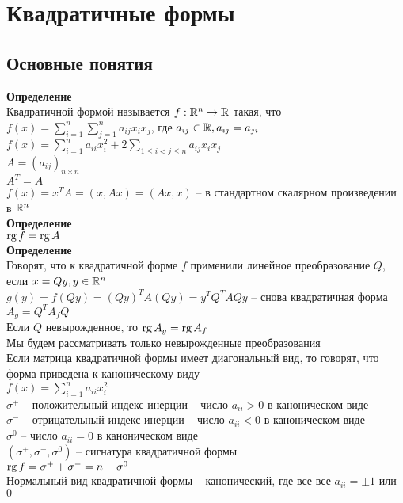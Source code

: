 \documentclass[12pt]{article}
\begin{document}
\section{Квадратичные формы}
\subsection{Основные понятия}
\textbf{Определение}\\
Квадратичной формой называется $f: \mathbb{R}^n \rightarrow \mathbb{R}$ такая, что $f(x) = \sum_{i=1}^n \sum_{j=1}^n a_{ij}x_ix_j$, где $a_{ij} \in \mathbb{R}, a_{ij} = a_{ji}$\\
$f(x) = \sum_{i=1}^n a_{ii}x_i^2 + 2 \sum_{1 \leq i < j \leq n} a_{ij} x_ix_j$\\
$A = (a_{ij})_{n\times n}$\\
$A^T = A$\\
$f(x) = x^T A  = (x, Ax) = (Ax, x)$ -- в стандартном скалярном произведении в $\mathbb{R}^n$\\
\textbf{Определение}\\
$\operatorname{rg} f = \operatorname{rg} A$\\
\textbf{Определение}\\
Говорят, что к квадратичной форме $f$ применили линейное преобразование $Q$, если $x = Qy, y \in \mathbb{R}^n$\\
$g(y) = f(Qy) = (Qy)^TA(Qy) = y^T Q^TAQy$ -- снова квадратичная форма\\
$A_g = Q^T A_f Q$\\
Если $Q$ невырожденное, то $\operatorname{rg} A_g = \operatorname{rg} A_f$\\
Мы будем рассматривать только невырожденные преобразования\\
Если матрица квадратичной формы имеет диагональный вид, то говорят, что форма приведена к каноническому виду\\
$f(x) = \sum_{i=1}^n a_{ii}x_i^2$\\
$\sigma^+$ -- положительный индекс инерции -- число $a_{ii} > 0$ в каноническом виде\\
$\sigma^-$ -- отрицательный индекс инерции -- число $a_{ii} < 0$ в каноническом виде\\
$\sigma^0$ -- число $a_{ii} = 0$ в каноническом виде\\
$(\sigma^+, \sigma^-, \sigma^0)$ -- сигнатура квадратичной формы\\
$\operatorname{rg} f = \sigma^+ + \sigma^- = n - \sigma^0$\\
Нормальный вид квадратичной формы -- канонический, где все все $a_{ii} = \pm1$ или $0$\\
\end{document}
